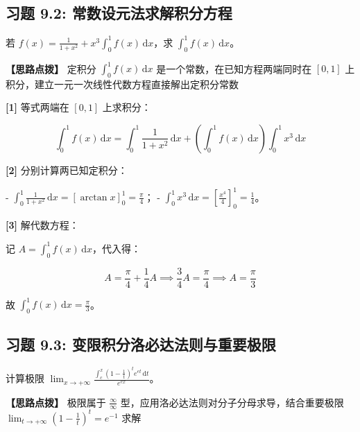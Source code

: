 \documentclass[11pt,a4paper,UTF8]{ctexart}
\begin{document}
\subsection{习题 9.2: 常数设元法求解积分方程}

若 $f(x) = \frac{1}{1+x^2} + x^3 \int_0^1 f(x)\,\mathrm{d}x$，求 $\int_0^1 f(x)\,\mathrm{d}x$。

\textbf{\color{DeepPurple}【思路点拨】} 定积分 $\int_0^1 f(x)\,\mathrm{d}x$ 是一个常数，在已知方程两端同时在 $[0, 1]$ 上积分，建立一元一次线性代数方程直接解出定积分常数


\begin{solbox}[分步推导与答题规范]
\textbf{[1]} 等式两端在 $[0, 1]$ 上求积分：


\begin{equation*}
\int_0^1 f(x)\,\mathrm{d}x = \int_0^1 \frac{1}{1+x^2}\,\mathrm{d}x + \left(\int_0^1 f(x)\,\mathrm{d}x\right) \int_0^1 x^3\,\mathrm{d}x
\end{equation*}


\textbf{[2]} 分别计算两已知定积分：

- $\int_0^1 \frac{1}{1+x^2}\,\mathrm{d}x = [\arctan x]_0^1 = \frac{\pi}{4}$；
- $\int_0^1 x^3\,\mathrm{d}x = \left[ \frac{x^4}{4} \right]_0^1 = \frac{1}{4}$。

\textbf{[3]} 解代数方程：

记 $A = \int_0^1 f(x)\,\mathrm{d}x$，代入得：


\begin{equation*}
A = \frac{\pi}{4} + \frac{1}{4}A \implies \frac{3}{4}A = \frac{\pi}{4} \implies A = \frac{\pi}{3}
\end{equation*}


故 $\int_0^1 f(x)\,\mathrm{d}x = \frac{\pi}{3}$。
\end{solbox}


\subsection{习题 9.3: 变限积分洛必达法则与重要极限}

计算极限 $\lim_{x \to +\infty} \frac{\int_c^x \left(1-\frac{1}{t}\right)^t e^{et}\,\mathrm{d}t}{e^{ex}}$。

\textbf{\color{DeepPurple}【思路点拨】} 极限属于 $\frac{\infty}{\infty}$ 型，应用洛必达法则对分子分母求导，结合重要极限 $\lim_{t \to +\infty} (1-\frac{1}{t})^t = e^{-1}$ 求解
\end{document}
